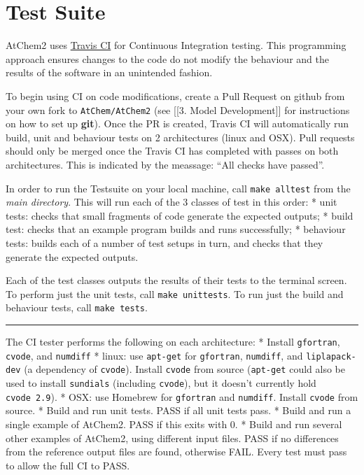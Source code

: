 \section{Test Suite} \label{sec:testsuite}

AtChem2 uses \href{https://travis-ci.org/}{Travis CI} for Continuous
Integration testing. This programming approach ensures changes to the
code do not modify the behaviour and the results of the software in an
unintended fashion.

To begin using CI on code modifications, create a Pull Request on github
from your own fork to \texttt{AtChem/AtChem2} (see {[}{[}3. Model
Development{]}{]} for instructions on how to set up \textbf{git}). Once
the PR is created, Travis CI will automatically run build, unit and
behaviour tests on 2 architectures (linux and OSX). Pull requests should
only be merged once the Travis CI has completed with passes on both
architectures. This is indicated by the meassage: ``All checks have
passed''.

In order to run the Testsuite on your local machine, call
\texttt{make\ alltest} from the \emph{main directory}. This will run
each of the 3 classes of test in this order: * unit tests: checks that
small fragments of code generate the expected outputs; * build test:
checks that an example program builds and runs successfully; * behaviour
tests: builds each of a number of test setups in turn, and checks that
they generate the expected outputs.

Each of the test classes outputs the results of their tests to the
terminal screen. To perform just the unit tests, call
\texttt{make\ unittests}. To run just the build and behaviour tests,
call \texttt{make\ tests}.

\begin{center}\rule{0.5\linewidth}{\linethickness}\end{center}

The CI tester performs the following on each architecture: * Install
\texttt{gfortran}, \texttt{cvode}, and \texttt{numdiff} * linux: use
\texttt{apt-get} for \texttt{gfortran}, \texttt{numdiff}, and
\texttt{liplapack-dev} (a dependency of \texttt{cvode}). Install
\texttt{cvode} from source (\texttt{apt-get} could also be used to
install \texttt{sundials} (including \texttt{cvode}), but it doesn't
currently hold \texttt{cvode\ 2.9}). * OSX: use Homebrew for
\texttt{gfortran} and \texttt{numdiff}. Install \texttt{cvode} from
source. * Build and run unit tests. PASS if all unit tests pass. * Build
and run a single example of AtChem2. PASS if this exits with 0. * Build
and run several other examples of AtChem2, using different input files.
PASS if no differences from the reference output files are found,
otherwise FAIL. Every test must pass to allow the full CI to PASS.

